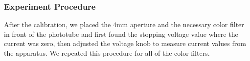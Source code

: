 		\subsubsection{Experiment Procedure}
			After the calibration, we placed the 4mm aperture and the necessary color filter in front of the phototube and first found the stopping voltage value where the current was zero, then adjusted the voltage knob to measure current values from the apparatus. We repeated this procedure for all of the color filters.
